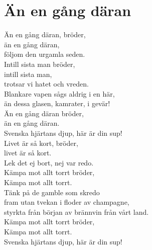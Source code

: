 \section{Än en gång däran}
Än en gång däran, bröder,\\
än en gång däran,\\
följom den urgamla seden.\\
Intill sista man bröder,\\
intill sista man,\\
trotsar vi hatet och vreden.\\
Blankare vapen sågs aldrig i en här,\\
än dessa glasen, kamrater, i gevär!\\
Än en gång däran bröder,\\
än en gång däran.\\
Svenska hjärtans djup, här är din sup!\\

Livet är så kort, bröder,\\
livet är så kort.\\
Lek det ej bort, nej var redo.\\
Kämpa mot allt torrt bröder,\\
Kämpa mot allt torrt.\\
Tänk på de gamble som skredo\\
fram utan tvekan i floder av champagne,\\
styrkta från början av brännvin från vårt land.\\
Kämpa mot allt torrt bröder,\\
Kämpa mot allt torrt.\\
Svenska hjärtans djup, här är din sup!\\